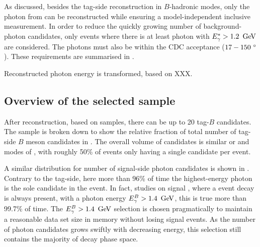As discussed, besides the tag-side reconstruction in $B$-hadronic modes, only the photon from \BtoXsgamma can be reconstructed while ensuring a model-independent inclusive measurement.
In order to reduce the quickly growing number of background-photon candidates, only events where there is at least photon with ${E^*_{\gamma}}>1.2~\mathrm{\,Ge\kern -0.1em V}$ are considered.
The photons must also be within the CDC acceptance ($17-150~^{\circ}$).
These requirements are summarised in .
\begin{table}[htbp!]
    \centering
     \caption{\label{tab:photon_requirements} Requirements for photons in reconstructed events.}
\end{table}

Reconstructed photon energy is transformed, based on XXX.

\subsection{Overview of the selected sample}\label{sec:reconstruction_overview}

After reconstruction, based on \MC samples, there can be up to 20 tag-$B$ candidates.
The sample is broken down to show the relative fraction of total number of tag-side $B$ meson candidates in .
The overall volume of candidates is similar or \Bp and \Bz modes of \FEI, with roughly 50\% of events only having a single candidate per event.

A similar distribution for number of signal-side photon candidates is shown in .
Contrary to the tag-side, here more than 96\% of time the highest-energy photon is the sole candidate in the event.
In fact, studies on signal \MC, where a \BtoXsgamma event decay is always present, with a photon energy ${E^B_{\gamma}}>1.4~\mathrm{\,Ge\kern -0.1em V}$, this is true more than  99.7\% of time.
The ${E^B_{\gamma}}>1.4~\mathrm{\,Ge\kern -0.1em V}$ selection is chosen pragmatically to maintain a reasonable data set size in memory without losing signal events.
As the number of photon candidates grows swiftly with decreasing energy, this selection still contains the majority of \BtoXsgamma decay phase space.

